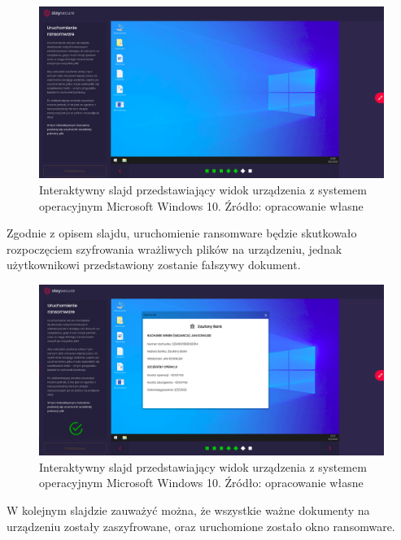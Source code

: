 \documentclass[12pt,twoside]{article}
\begin{document}
\begin{figure}[H]
	\centering
	\includegraphics[width=0.99\linewidth]{figures/ransomware-slide-screenshot2}
	\caption{Interaktywny slajd przedstawiający widok urządzenia z systemem operacyjnym Microsoft Windows 10. Źródło: opracowanie własne}
\end{figure}

Zgodnie z opisem slajdu, uruchomienie ransomware będzie skutkowało rozpoczęciem szyfrowania wrażliwych plików na urządzeniu, jednak użytkownikowi przedstawiony zostanie fałszywy dokument. 

\begin{figure}[H]
	\centering
	\includegraphics[width=0.98\linewidth]{figures/ransomware-slide-screenshot3}
	\caption{Interaktywny slajd przedstawiający widok urządzenia z systemem operacyjnym Microsoft Windows 10. Źródło: opracowanie własne}
\end{figure}

W kolejnym slajdzie zauważyć można, że wszystkie ważne dokumenty na urządzeniu zostały zaszyfrowane, oraz uruchomione zostało okno ransomware.
\end{document}
